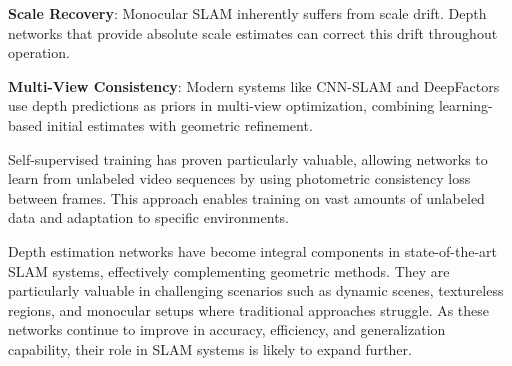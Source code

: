 \documentclass[12pt]{article}
\begin{document}
    \textbf{Scale Recovery}: Monocular SLAM inherently suffers from scale drift. Depth networks that provide absolute scale estimates can correct this drift throughout operation.
    
    \textbf{Multi-View Consistency}: Modern systems like CNN-SLAM and DeepFactors \cite{deepfactors} use depth predictions as priors in multi-view optimization, combining learning-based initial estimates with geometric refinement.
        
    Self-supervised training has proven particularly valuable, allowing networks to learn from unlabeled video sequences by using photometric consistency loss between frames. This approach enables training on vast amounts of unlabeled data and adaptation to specific environments.
        
    Depth estimation networks have become integral components in state-of-the-art SLAM systems, effectively complementing geometric methods. They are particularly valuable in challenging scenarios such as dynamic scenes, textureless regions, and monocular setups where traditional approaches struggle. As these networks continue to improve in accuracy, efficiency, and generalization capability, their role in SLAM systems is likely to expand further.



    
    \newpage
    \printbibliography[title={References}]
\end{document}
